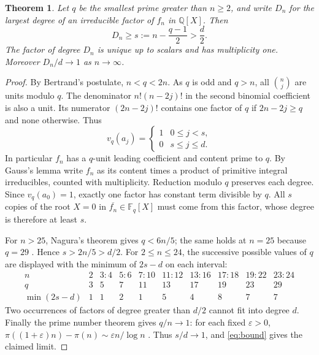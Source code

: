 \documentclass[10pt]{article}
\newtheorem{theorem}{Theorem}
\newcommand{\Q}{\mathbb Q}
\newcommand{\F}{\mathbb F}
\begin{document}
\begin{theorem}\label{thm:giant}
Let $q$ be the smallest prime greater than $n\ge2$, and write $D_n$ for the largest degree of an irreducible factor of $f_n$ in $\Q[X]$. Then
\begin{equation}\label{eq:bound}
 D_n\ge s:=n-\frac{q-1}{2}>\frac{d}{2}.
\end{equation}
The factor of degree $D_n$ is unique up to scalars and has multiplicity one. Moreover $D_n/d\to1$ as $n\to\infty$.
\end{theorem}
\begin{proof}
By Bertrand's postulate, $n<q<2n$. As $q$ is odd and $q>n$, all $\binom nj$ are units modulo $q$. The denominator $n!(n-2j)!$ in the second binomial coefficient is also a unit. Its numerator $(2n-2j)!$ contains one factor of $q$ if $2n-2j\ge q$ and none otherwise. Thus
\[
 v_q(a_j)=\begin{cases}1&0\le j<s,\\0&s\le j\le d.\end{cases}
\]
In particular $f_n$ has a $q$-unit leading coefficient and content prime to $q$. By Gauss's lemma write $f_n$ as its content times a product of primitive integral irreducibles, counted with multiplicity. Reduction modulo $q$ preserves each degree. Since $v_q(a_0)=1$, exactly one factor has constant term divisible by $q$. All $s$ copies of the root $X=0$ in $\overline{f_n}\in\F_q[X]$ must come from this factor, whose degree is therefore at least $s$.

For $n>25$, Nagura's theorem gives $q<6n/5$; the same holds at $n=25$ because $q=29$ \cite{nagura}. Hence $s>2n/5>d/2$. For $2\le n\le24$, the successive possible values of $q$ are displayed with the minimum of $2s-d$ on each interval:
\[
\begin{array}{c|rrrrrrrrr}
 n&2&3\!:\!4&5\!:\!6&7\!:\!10&11\!:\!12&13\!:\!16&17\!:\!18&19\!:\!22&23\!:\!24\\ \hline
 q&3&5&7&11&13&17&19&23&29\\
 \min(2s-d)&1&1&2&1&5&4&8&7&7
\end{array}
\]
Two occurrences of factors of degree greater than $d/2$ cannot fit into degree $d$. Finally the prime number theorem gives $q/n\to1$: for each fixed $\varepsilon>0$, $\pi((1+\varepsilon)n)-\pi(n)\sim\varepsilon n/\log n$ \cite{pnt}. Thus $s/d\to1$, and \eqref{eq:bound} gives the claimed limit.
\end{proof}
\end{document}
